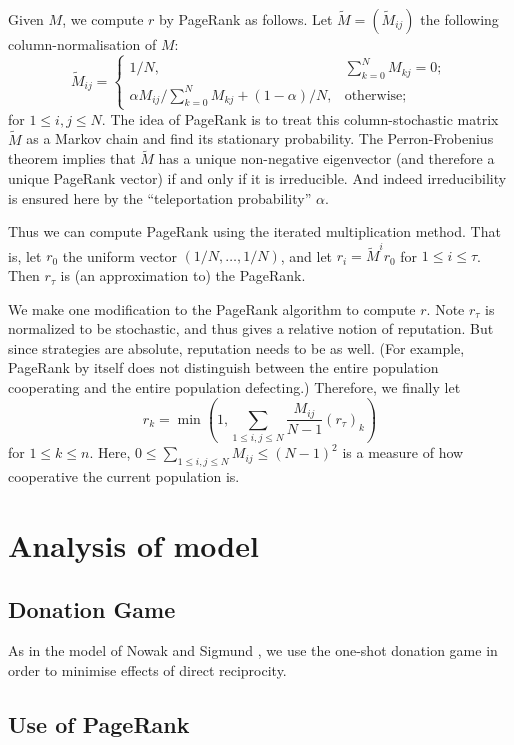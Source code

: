 \documentclass{amsart}
\begin{document}
Given $M$, we compute $r$ by PageRank as follows. Let $\tilde M =
(\tilde M_{ij})$ the following column-normalisation of $M$:
\[
\tilde M_{ij} =
\begin{cases}
  1/N, & \sum_{k=0}^N M_{kj} = 0; \\ 
  \alpha M_{ij} / \sum_{k=0}^N M_{kj} + (1-\alpha)/N, & \text{otherwise};
\end{cases}
\]
for $1 \le i,j \le N$. The idea of PageRank is to treat this
column-stochastic matrix $\tilde M$ as a Markov chain and find its
stationary probability. The Perron-Frobenius theorem implies that
$\tilde M$ has a unique non-negative eigenvector (and therefore a
unique PageRank vector) if and only if it is irreducible. And indeed
irreducibility is ensured here by the ``teleportation probability''
$\alpha$.

Thus we can compute PageRank using the iterated multiplication method.
That is, let $r_0$ the uniform vector $(1/N,\ldots,1/N)$, and let $r_i =
\tilde M^i r_0$ for $1 \le i \le \tau$. Then $r_\tau$ is (an
approximation to) the PageRank.

We make one modification to the PageRank algorithm to compute
$r$. Note $r_\tau$ is normalized to be stochastic, and thus gives a
relative notion of reputation. But since strategies are absolute,
reputation needs to be as well. (For example, PageRank by itself does
not distinguish between the entire population cooperating and the
entire population defecting.) Therefore, we finally let
\[
r_k = \min\left(1,\sum_{1 \le i,j \le N} \frac{M_{ij}}{N-1}(r_\tau)_k\right)
\]
for $1 \le k \le n$. Here, $0 \le \sum_{1 \le i,j \le N} M_{ij} \le
(N-1)^2$ is a measure of how cooperative the current population is.


\section{Analysis of model}
\label{section-analysis}

\subsection{Donation Game}

As in the model of Nowak and Sigmund \cite{nowak_evolution_1998}, we
use the one-shot donation game in order to minimise effects of direct
reciprocity.

\subsection{Use of PageRank}
\label{section-whypagerank}
\end{document}
